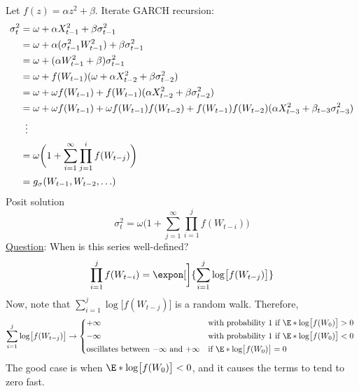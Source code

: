 Let $ f(z)=\alpha z^2+\beta $.
Iterate GARCH recursion:
\begin{align*}
    \sigma_t^2
     & =\omega+\alpha X_{t-1}^2+\beta \sigma_{t-1}^2                                                                          \\
     & =\omega+\alpha(\sigma_{t-1}^2 W_{t-1}^2)+\beta \sigma_{t-1}^2                                                          \\
     & =\omega+(\alpha W_{t-1}^2+\beta)\sigma_{t-1}^2                                                                         \\
     & =\omega+f(W_{t-1})(\omega+\alpha X_{t-2}^2+\beta \sigma_{t-2}^2)                                                       \\
     & =\omega+\omega f(W_{t-1})+f(W_{t-1})(\alpha X_{t-2}^2+\beta \sigma_{t-2}^2)                                            \\
     & =\omega+\omega f(W_{t-1})+\omega f(W_{t-1})f(W_{t-2})+f(W_{t-1})f(W_{t-2})(\alpha X_{t-3}^2+\beta_{t-3}\sigma_{t-3}^2) \\
     & \vdotswithin{=}                                                                                                        \\
     & =\omega\biggl(1+\sum_{i=1}^{\infty} \prod_{j=1}^i f(W_{t-j})\biggr)                                                    \\
     & =g_\sigma (W_{t-1},W_{t-2},\ldots)
\end{align*}
Posit solution
\[ \sigma_t^2=\omega\biggl(1+\sum_{j=1}^{\infty} \prod_{i=1}^j f(W_{t-i})\biggr) \]
\underline{Question}: When is this series well-defined?
\[ \prod_{i=1}^j f(W_{t-i})=\expon[\bigg]{\sum_{i=1}^{j} \log\bigl[f(W_{t-j})\bigr]} \]
Now, note that $ \sum_{i=1}^{j} \log\bigl[f(W_{t-j})\bigr] $ is a random walk. Therefore,
\[ \sum_{i=1}^{j} \log\bigl[f(W_{t-j})\bigr]\to
    \begin{cases*}
        +\infty                                               & with probability $ 1 $ if $ \E*{\log\bigl[f(W_0)\bigr]}>0 $ \\
        -\infty                                               & with probability $ 1 $ if $ \E*{\log\bigl[f(W_0)\bigr]}<0 $ \\
        \text{oscillates between $ -\infty $ and $ +\infty $} & if $\E*{\log\bigl[f(W_0)\bigr]}=0$
    \end{cases*} \]
The good case is when $ \E*{\log\bigl[f(W_0)\bigr]}<0 $, and it causes the terms to tend to zero fast.
